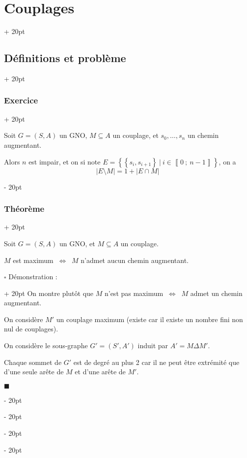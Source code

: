 \documentclass[a4paper, 12pt, twoside]{article}
\newcommand{\nset}[2]{\left\llbracket #1\ ;\ #2 \right\rrbracket}
\newcommand{\set}[1]{\left\{ #1 \right\}}
\newcommand{\abs}[1]{\left\lvert #1 \right\rvert}
\newcommand{\ssi}{\ \Leftrightarrow \ }
\newcommand{\ind}[1][20pt]{\advance\leftskip + #1}
\newcommand{\deind}[1][20pt]{\advance\leftskip - #1}
\newenvironment{indt}[2][20pt]{#2 \par \ind[#1]}{\par \deind} %
\newenvironment{proof}[1][{Démonstration :}]{\begin{indt}{$\square$ #1}}{$\blacksquare$ \end{indt}}
\begin{document}
\begin{indt}{\section{Couplages}}
\begin{indt}{\subsection{Définitions et problème}}
            \vspace{12pt}
            
            \begin{indt}{\subsubsection{Exercice}}
                \label{3.1.5}

                Soit $G = (S, A)$ un GNO, $M \subseteq A$ un couplage, et $s_0, \ldots, s_n$ un chemin augmentant.

                Alors $n$ est impair, et on si note $E = \set{\set{s_i, s_{i + 1}}\ |\ i \in \nset 0 {n - 1}}$, on a
                \[
                    \abs{E \setminus M} = 1 + \abs{E \cap M}
                \]
            \end{indt}

            \vspace{12pt}
            
            \begin{indt}{\subsubsection{Théorème}}
                \label{3.1.6}

                Soit $G = (S, A)$ un GNO, et $M \subseteq A$ un couplage.

                \begin{pseudocode}
                    $M$ est maximum $\ssi$ $M$ n'admet aucun chemin augmentant.
                \end{pseudocode}

                \vspace{12pt}
                
                \begin{proof}
                    On montre plutôt que $M$ n'est pas maximum $\ssi$ $M$ admet un chemin augmentant.

                    \vspace{6pt}
                    
                    \boxed{\Rightarrow} On considère $M'$ un couplage maximum (existe car il existe un nombre fini non nul de couplages).

                    On considère le sous-graphe $G' = (S', A')$ induit par $A' = M \Delta M'$.

                    Chaque sommet de $G'$ est de degré au plus 2 car il ne peut être extrémité que d'une seule arête de $M$ et d'une arête de $M'$.


\end{proof}
\end{indt}
\end{indt}
\end{indt}
\end{document}
